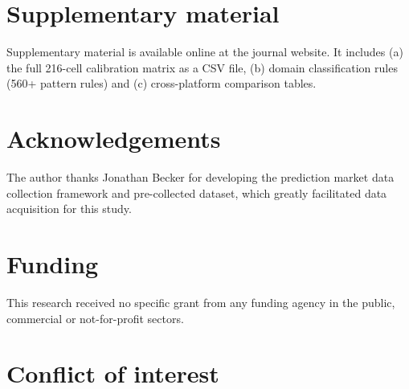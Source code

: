 \documentclass[numsec,webpdf,modern,medium]{oup-authoring-template}
\theoremstyle{thmstyleone}%
\theoremstyle{thmstyletwo}%
\theoremstyle{thmstylethree}%
\begin{document}
\section*{Supplementary material}

Supplementary material is available online at the journal website. It includes (a) the full 216-cell calibration matrix as a CSV file, (b) domain classification rules (560+ pattern rules) and (c) cross-platform comparison tables.

\section*{Acknowledgements}

The author thanks Jonathan Becker for developing the prediction market data collection framework and pre-collected dataset, which greatly facilitated data acquisition for this study.

\section*{Funding}

This research received no specific grant from any funding agency in the public, commercial or not-for-profit sectors.

\section*{Conflict of interest}
\end{document}
